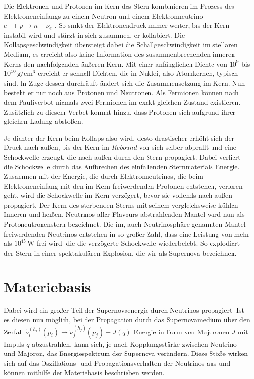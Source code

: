Die Elektronen und Protonen im Kern des Stern kombinieren im Prozess des Elektroneneinfangs zu einem Neutron und einem Elektronneutrino $e^- + p \rightarrow n + \nu_e$ \cite{supernovaepaper}.
So sinkt der Elektronendruck immer weiter, bis der Kern instabil wird und stürzt in sich zusammen, er kollabiert.
Die Kollapsgeschwindigkeit übersteigt dabei die Schallgeschwindigkeit im stellaren Medium, es erreicht also keine Information des zusammenbrechenden inneren Kerns den nachfolgenden äußeren Kern.
Mit einer anfänglichen Dichte von $10^9$ bis $10^{10} \, \si{\gram \per \centi\cubic\meter}$ erreicht er schnell Dichten, die in Nuklei, also Atomkernen, typisch sind.
In Zuge dessen durchläuft ändert sich die Zusammensetzung im Kern.
Nun besteht er nur noch aus Protonen und Neutronen.
Als Fermionen können nach dem Pauliverbot niemals zwei Fermionen im exakt gleichen Zustand existieren.
Zusätzlich zu diesem Verbot kommt hinzu, dass Protonen sich aufgrund ihrer gleichen Ladung abstoßen.

Je dichter der Kern beim Kollaps also wird, desto drastischer erhöht sich der Druck nach außen, bis der Kern im \textit{Rebound} von sich selber abprallt und eine Schockwelle erzeugt, die nach außen durch den Stern propagiert.
Dabei verliert die Schockwelle durch das Aufbrechen des einfallenden Sternmaterials Energie.
Zusammen mit der Energie, die durch Elektronneutrinos, die beim Elektroneneinfang mit den im Kern freiwerdenden Protonen entstehen, verloren geht, wird die Schockwelle im Kern verzögert, bevor sie vollends nach außen propagiert.
Der Kern des sterbenden Sterns mit seinem vergleichsweise kühlen Inneren und heißen, Neutrinos aller Flavours abstrahlenden Mantel wird nun als Protoneutronenstern bezeichnet.
Die im, auch Neutrinosphäre genannten Mantel freiwerdenden Neutrinos entstehen in so großer Zahl, dass eine Leistung von mehr als $10^{45} \,\si{\watt}$ frei wird, die die verzögerte Schockwelle wiederbelebt.
So explodiert der Stern in einer spektakulären Explosion, die wir als Supernova bezeichnen.

\section{Materiebasis} %
\label{subsec:materiebasis}

Dabei wird ein großer Teil der Supernovaenergie durch Neutrinos propagiert.
Ist es diesen nun möglich, bei der Propagation durch das Supernovamedium über den Zerfall $\tilde{\nu}^{(h_i)}_i (p_i) \rightarrow \tilde{\nu}^{(h_j)}_j (p_j) + J(q)$
Energie in Form von Majoronen $J$ mit Impuls $q$ abzustrahlen, kann sich, je nach Kopplungsstärke zwischen Neutrino und Majoron, das Energiespektrum der Supernova verändern.
Diese Stöße wirken sich auf das Oszillations- und Propagationsverhalten der Neutrinos aus und können mithilfe der Materiebasis beschrieben werden.

